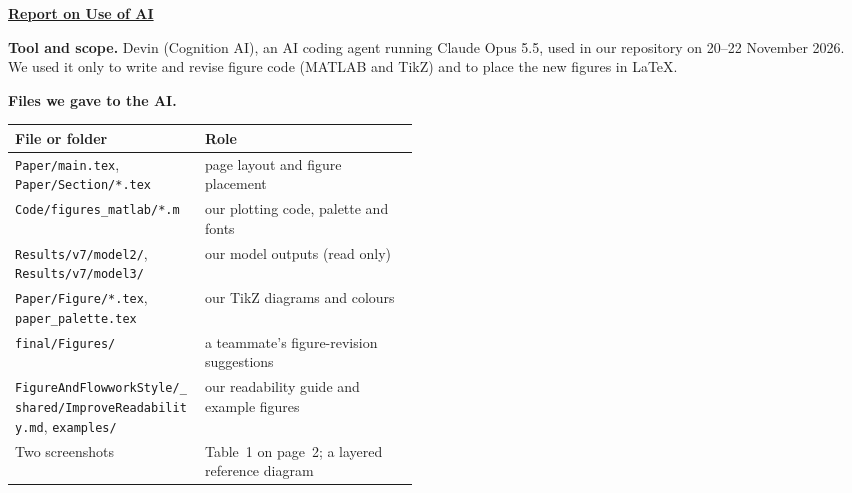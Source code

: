 \AImatter
\begingroup
\small
\setlength{\parskip}{3pt}
\centerline{\underline{\large\sffamily\bfseries Report on Use of AI}}
\vspace{6pt}

\noindent\textbf{Tool and scope.} Devin (Cognition AI), an AI coding agent running Claude Opus 5.5, used in our repository on 20--22 November 2026. We used it only to write and revise figure code (MATLAB and TikZ) and to place the new figures in LaTeX.

\noindent{}

\vspace{4pt}
\noindent\textbf{Files we gave to the AI.}\par
\noindent\begin{tabularx}{\linewidth}{@{}>{\raggedright\arraybackslash}p{0.47\linewidth}>{\raggedright\arraybackslash}X@{}}
\toprule
\textbf{File or folder} & \textbf{Role} \\ \midrule
\texttt{Paper/main.tex}, \texttt{Paper/Section/*.tex} & page layout and figure placement \\
\texttt{Code/figures\_matlab/*.m} & our plotting code, palette and fonts \\
\texttt{Results/v7/model2/}, \texttt{Results/v7/model3/} & our model outputs (read only) \\
\texttt{Paper/Figure/*.tex}, \texttt{paper\_palette.tex} & our TikZ diagrams and colours \\
\texttt{final/Figures/} & a teammate's figure-revision suggestions \\
\texttt{FigureAndFlowworkStyle/\_shared/}\newline\texttt{ImproveReadability.md}, \texttt{examples/} & our readability guide and example figures \\
Two screenshots & Table~1 on page~2; a layered reference diagram \\ \bottomrule
\end{tabularx}

